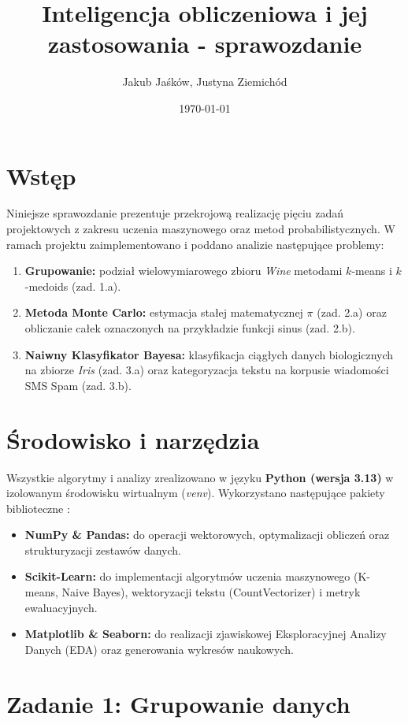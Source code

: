 \documentclass[12pt, a4paper]{article}
\title{\textbf{Inteligencja obliczeniowa i jej zastosowania - sprawozdanie}}
\author{Jakub Jaśków, Justyna Ziemichód}
\date{\today}
\begin{document}
\maketitle
\tableofcontents
\newpage

\section{Wstęp}
Niniejsze sprawozdanie prezentuje przekrojową realizację pięciu zadań projektowych z zakresu uczenia maszynowego oraz metod probabilistycznych. W ramach projektu zaimplementowano i poddano analizie następujące problemy:
\begin{enumerate}
    \item \textbf{Grupowanie:} podział wielowymiarowego zbioru \textit{Wine} metodami $k$-means i $k$-medoids (zad. 1.a).
    \item \textbf{Metoda Monte Carlo:} estymacja stałej matematycznej $\pi$ (zad. 2.a) oraz obliczanie całek oznaczonych na przykładzie funkcji sinus (zad. 2.b).
    \item \textbf{Naiwny Klasyfikator Bayesa:} klasyfikacja ciągłych danych biologicznych na zbiorze \textit{Iris} (zad. 3.a) oraz kategoryzacja tekstu na korpusie wiadomości SMS Spam (zad. 3.b).
\end{enumerate}

\section{Środowisko i narzędzia}
Wszystkie algorytmy i analizy zrealizowano w języku \textbf{Python (wersja 3.13)} w izolowanym środowisku wirtualnym (\textit{venv}). Wykorzystano następujące pakiety biblioteczne \cite{scikit-learn}:
\begin{itemize}
    \item \textbf{NumPy \& Pandas:} do operacji wektorowych, optymalizacji obliczeń oraz strukturyzacji zestawów danych.
    \item \textbf{Scikit-Learn:} do implementacji algorytmów uczenia maszynowego (K-means, Naive Bayes), wektoryzacji tekstu (CountVectorizer) i metryk ewaluacyjnych.
    \item \textbf{Matplotlib \& Seaborn:} do realizacji zjawiskowej Eksploracyjnej Analizy Danych (EDA) oraz generowania wykresów naukowych.
\end{itemize}

\section{Zadanie 1: Grupowanie danych}
\end{document}
